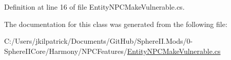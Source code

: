 Definition at line 16 of file Entity\+N\+P\+C\+Make\+Vulnerable.\+cs.



The documentation for this class was generated from the following file\+:\begin{DoxyCompactItemize}
\item 
C\+:/\+Users/jkilpatrick/\+Documents/\+Git\+Hub/\+Sphere\+I\+I.\+Mods/0-\/\+Sphere\+I\+I\+Core/\+Harmony/\+N\+P\+C\+Features/\mbox{\hyperlink{_entity_n_p_c_make_vulnerable_8cs}{Entity\+N\+P\+C\+Make\+Vulnerable.\+cs}}\end{DoxyCompactItemize}
